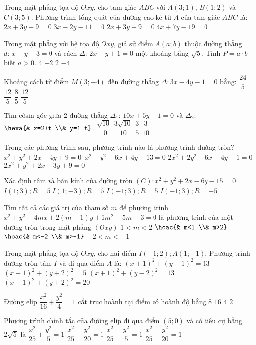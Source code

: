 \begin{ex}
Trong mặt phẳng tọa độ $Oxy$, cho tam giác $ABC$ với $A(3;1)$, $B(1;2)$ và $C(3;5)$. Phương trình tổng quát của đường cao kẻ từ $A$ của tam giác $ABC$ là:
\choice
{\True $2x+3y-9=0$}
{$3x-2y-11=0$}
{$2x+3y+9=0$}
{$4x+7y-19=0$}
\end{ex}
\begin{ex}
Trong mặt phẳng với hệ tọa độ $Oxy$, giả sử điểm $A\left(a;b\right)$ thuộc đường thẳng $d\colon \,x-y-3=0$ và cách $\Delta \colon \,2x-y+1=0$ một khoảng bằng $\sqrt{5}$. Tính $P=a \cdot b$ biết $a>0$. 
\choice
{$4$}
{\True $-2$}
{$2$}
{$-4$}
\end{ex}
\begin{ex}
Khoảng cách từ điểm $M(3;-4)$ đến đường thẳng $\Delta \colon 3x-4y-1=0$ bằng:
\choice
{\True $\dfrac{24}{5}$}
{$\dfrac{12}{5}$}
{$\dfrac{8}{5}$}
{$\dfrac{12}{5}$}
\end{ex}
\begin{ex}
Tìm côsin góc giữa $2$ đường thẳng $\Delta _1$: $10x+5y-1=0$ và $\Delta _2$:$\heva{& x=2+t \\& y=1-t}$.
\choice
{$\dfrac{\sqrt{10}}{10}$}
{\True $\dfrac{3\sqrt{10}}{10}$}
{$\dfrac{3}{5}$}
{$\dfrac{3}{10}$}
\end{ex}
\begin{ex}
Trong các phương trình sau, phương trình nào là phương trình đường tròn?
\choice
{$x^2+y^2+2x-4y+9=0$}
{$\,x^2+y^2-6x+4y+13=0$}
{\True $2x^2+2y^2-6x-4y-1=0$}
{$2x^2+y^2+2x-3y+9=0$}
\end{ex}
\begin{ex}
Xác định tâm và bán kính của đường tròn $(C)\colon x^2+y^2+2x-6y-15=0$
\choice
{$I(1;3);R=5$}
{$I(1;-3);R=5$}
{\True $I(-1;3);R=5$}
{$I(-1;3);R=-5$}
\end{ex}
\begin{ex}
Tìm tất cả các giá trị của tham số $m$ để phương trình $x^2+y^2-4mx+2(m-1)y+6m^2-5m+3=0$ là phương trình của một đường tròn trong mặt phẳng $(Oxy)$ 
\choice
{\True $1<m<2$}
{$\hoac{& m<1 \\& m>2}$}
{$\hoac{& m<-2 \\& m>-1}$}
{$-2<m<-1$}
\end{ex}
\begin{ex}
Trong mặt phẳng tọa độ $Oxy$, cho hai điểm $I(-1;2);A(1;-1)$. Phương trình đường tròn tâm $I$ và đi qua điểm $A$ là:
\choice
{${{(x+1)}^2}+{{(y-1)}^2}=13$}
{${{(x-1)}^2}+{{(y+2)}^2}=5$}
{\True ${{(x+1)}^2}+{{(y-2)}^2}=13$}
{${{(x-1)}^2}+{{(y+2)}^2}=20$}
\end{ex}
\begin{ex}
Đường elip $\dfrac{x^2}{16}+\dfrac{y^2}{4}=1$ cắt trục hoành tại điểm có hoành độ bằng
\choice
{\True $8$}
{$16$}
{$4$}
{$2$}
\end{ex}
\begin{ex}
Phương trình chính tắc của đường elip đi qua điểm $(5;0)$ và có tiêu cự bằng $2\sqrt{5}$ là
\choice
{$\dfrac{x^2}{25}+\dfrac{y^2}{5}=1$}
{\True $\dfrac{x^2}{25}+\dfrac{y^2}{20}=1$}
{$\dfrac{x^2}{25}-\dfrac{y^2}{5}=1$}
{$\dfrac{x^2}{25}-\dfrac{y^2}{20}=1$}
\end{ex}

